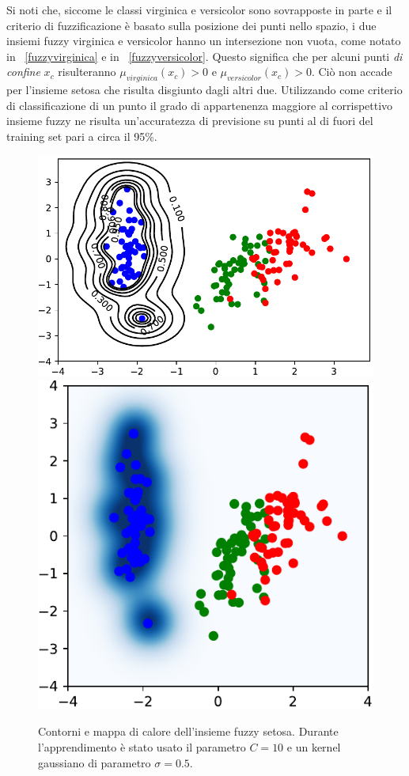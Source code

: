 \documentclass [11pt,a4paper,twoside,openright] {book}
\begin{document}
Si noti che, siccome le classi virginica e versicolor sono sovrapposte in parte e il criterio di fuzzificazione è basato sulla posizione dei punti nello spazio, i due insiemi fuzzy virginica e versicolor hanno un intersezione non vuota, come notato in \figurename~\ref{fuzzyvirginica} e in \figurename~\ref{fuzzyversicolor}. Questo significa che per alcuni punti \textit{di confine} $x_c$ risulteranno $\mu_{virginica}(x_c) > 0$ e $\mu_{versicolor}(x_c) > 0$.  Ciò non accade per l'insieme setosa che risulta disgiunto dagli altri due. Utilizzando come criterio di classificazione di un punto il grado di appartenenza maggiore al corrispettivo insieme fuzzy ne risulta un'accuratezza di previsione su punti al di fuori del training set pari a circa il 95\%.
\begin{figure}[!h]
        \centering%
        \subfigure
          {\includegraphics[scale=.5]{figure/setosamap.pdf}}\qquad\qquad
       \subfigure
          {\includegraphics[scale=.5]{figure/setosaheat.pdf}}
          \caption{Contorni e mappa di calore dell'insieme fuzzy setosa. Durante l'apprendimento è stato usato il parametro $C=10$ e un kernel gaussiano di parametro $\sigma=0.5$.}
\end{figure}
\end{document}
